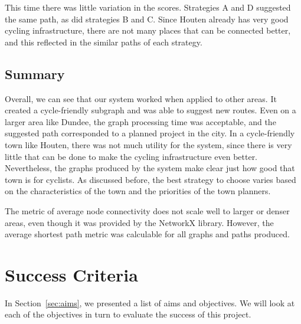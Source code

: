 \documentclass[12pt,a4paper]{report}
\begin{document}
This time there was little variation in the scores. Strategies A and D suggested the same path, as did strategies B and C. Since Houten already has very good cycling infrastructure, there are not many places that can be connected better, and this reflected in the similar paths of each strategy.

\subsection{Summary}
Overall, we can see that our system worked when applied to other areas. It created a cycle-friendly subgraph and was able to suggest new routes. Even on a larger area like Dundee, the graph processing time was acceptable, and the suggested path corresponded to a planned project in the city. In a cycle-friendly town like Houten, there was not much utility for the system, since there is very little that can be done to make the cycling infrastructure even better. Nevertheless, the graphs produced by the system make clear just how good that town is for cyclists. As discussed before, the best strategy to choose varies based on the characteristics of the town and the priorities of the town planners.

The metric of average node connectivity does not scale well to larger or denser areas, even though it was provided by the NetworkX library. However, the average shortest path metric was calculable for all graphs and paths produced.

\section{Success Criteria}\label{sec:success}
In Section~\ref{sec:aims}, we presented a list of aims and objectives. We will look at each of the objectives in turn to evaluate the success of this project.
\end{document}
